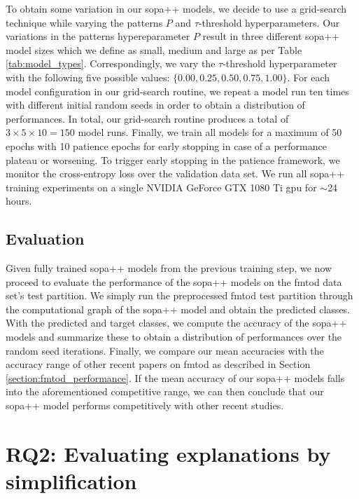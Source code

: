 To obtain some variation in our \ac{sopa}++ models, we decide to use a grid-search
technique while varying the patterns $P$ and $\tau$-threshold hyperparameters.
Our variations in the patterns hypereparameter $P$ result in three different
\ac{sopa}++ model sizes which we define as small, medium and large as per Table
\ref{tab:model_types}. Correspondingly, we vary the $\tau$-threshold
hyperparameter with the following five possible values: $\{0.00, 0.25, 0.50,
0.75, 1.00\}$. For each model configuration in our grid-search routine, we
repeat a model run ten times with different initial random seeds in order to
obtain a distribution of performances. In total, our grid-search routine
produces a total of $3\times5\times10=150$ model runs. Finally, we train all
models for a maximum of 50 epochs with 10 patience epochs for early stopping in
case of a performance plateau or worsening. To trigger early stopping in the
patience framework, we monitor the cross-entropy loss over the validation data
set. We run all \ac{sopa}++ training experiments on a single NVIDIA GeForce GTX 1080
Ti \ac{gpu} for $\sim$24 hours.

\subsection{Evaluation}

Given fully trained \ac{sopa}++ models from the previous training step, we now
proceed to evaluate the performance of the \ac{sopa}++ models on the \ac{fmtod} data set's
test partition. We simply run the preprocessed \ac{fmtod} test partition through the
computational graph of the \ac{sopa}++ model and obtain the predicted classes. With
the predicted and target classes, we compute the accuracy of the \ac{sopa}++ models
and summarize these to obtain a distribution of performances over the random
seed iterations. Finally, we compare our mean accuracies with the accuracy range
of other recent papers on \ac{fmtod} as described in Section
\ref{section:fmtod_performance}. If the mean accuracy of our \ac{sopa}++ models
falls into the aforementioned competitive range, we can then conclude that our
\ac{sopa}++ model performs competitively with other recent studies.

\section{RQ2: Evaluating explanations by simplification}

\label{section:evaluate_explain}

